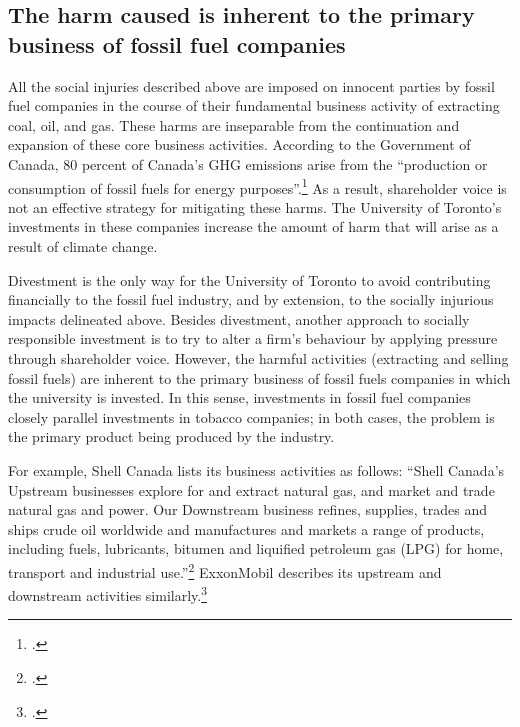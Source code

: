 	\subsection{The harm caused is inherent to the primary business of fossil fuel companies}



All the social injuries described above are imposed on innocent parties by fossil fuel companies in the course of their fundamental business activity of extracting coal, oil, and gas.
These harms are inseparable from the continuation and expansion of these core business activities.
According to the Government of Canada, 80 percent of Canada's GHG emissions arise from the ``production or consumption of fossil fuels for energy purposes''.\footcite[][]{GoConGHGs}
As a result, shareholder voice is not an effective strategy for mitigating these harms.
The University of Toronto's investments in these companies increase the amount of harm that will arise as a result of climate change.



Divestment is the only way for the University of Toronto to avoid contributing financially to the fossil fuel industry, and by extension, to the socially injurious impacts delineated above.
Besides divestment, another approach to socially responsible investment is to try to alter a firm’s behaviour by applying pressure through shareholder voice. 
However, the harmful activities (extracting and selling fossil fuels) are inherent to the primary business of fossil fuels companies in which the university is invested.  
In this sense, investments in fossil fuel companies closely parallel investments in tobacco companies; in both cases, the problem is the primary product being produced by the industry.



For example, Shell Canada lists its business activities as follows: ``Shell Canada's Upstream businesses explore for and extract natural gas, and market and trade natural gas and power. Our Downstream business refines, supplies, trades and ships crude oil worldwide and manufactures and markets a range of products, including fuels, lubricants, bitumen and liquified petroleum gas (LPG) for home, transport and industrial use.''\footcite[][]{ShellAtAGlance}
ExxonMobil describes its upstream and downstream activities similarly.\footcite[][]{ExxonWhatWeDo}




